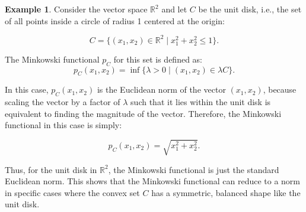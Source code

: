 \documentclass[12pt, reqno]{amsart}
\theoremstyle{definition}
\newtheorem{example}[theorem]{Example}
\numberwithin{equation}{section}
\newcommand{\dR}{{\mathbb R}}
\begin{document}
\begin{example}
    Consider the vector space $\dR^2$ and let $C$ be the unit disk, i.e., the set of all points inside a circle of radius 1 centered at the origin:

\[
C = \{ (x_1, x_2) \in \dR^2 \mid x_1^2 + x_2^2 \leq 1 \}.
\]

The Minkowski functional $p_C$ for this set is defined as:
\[
p_C(x_1, x_2) = \inf \{ \lambda > 0 \mid (x_1, x_2) \in \lambda C \}.
\]

In this case, $p_C(x_1, x_2)$ is the Euclidean norm of the vector $(x_1, x_2)$, because scaling the vector by a factor of $\lambda$ such that it lies within the unit disk is equivalent to finding the magnitude of the vector. Therefore, the Minkowski functional in this case is simply:

\[
p_C(x_1, x_2) = \sqrt{x_1^2 + x_2^2}.
\]

Thus, for the unit disk in $\dR^2$, the Minkowski functional is just the standard Euclidean norm. This shows that the Minkowski functional can reduce to a norm in specific cases where the convex set $C$ has a symmetric, balanced shape like the unit disk.
\end{example}
\end{document}
